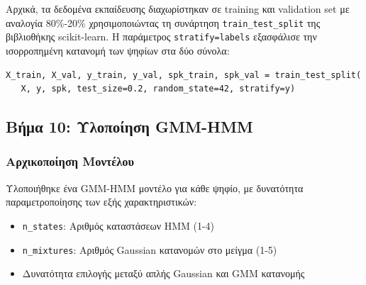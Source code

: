 \documentclass[a4paper,12pt]{article}
\begin{document}
Αρχικά, τα δεδομένα εκπαίδευσης διαχωρίστηκαν σε training και validation set με αναλογία 80\%-20\% χρησιμοποιώντας τη συνάρτηση \texttt{train\_test\_split} της βιβλιοθήκης scikit-learn. Η παράμετρος \texttt{stratify=labels} εξασφάλισε την ισορροπημένη κατανομή των ψηφίων στα δύο σύνολα:

\begin{verbatim}
X_train, X_val, y_train, y_val, spk_train, spk_val = train_test_split(
   X, y, spk, test_size=0.2, random_state=42, stratify=y)
\end{verbatim}

\subsection*{Βήμα 10: Υλοποίηση GMM-HMM}

\subsubsection*{Αρχικοποίηση Μοντέλου}
Υλοποιήθηκε ένα GMM-HMM μοντέλο για κάθε ψηφίο, με δυνατότητα παραμετροποίησης των εξής χαρακτηριστικών:
\begin{itemize}
    \item \texttt{n\_states}: Αριθμός καταστάσεων HMM (1-4)
    \item \texttt{n\_mixtures}: Αριθμός Gaussian κατανομών στο μείγμα (1-5)
    \item Δυνατότητα επιλογής μεταξύ απλής Gaussian και GMM κατανομής
\end{itemize}
\end{document}
